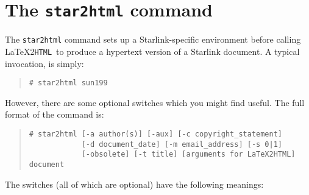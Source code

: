 \documentclass[twoside,11pt]{article}
\newcommand{\xlabel}[1]{}
\newcommand{\latextohtml}{\LaTeX2\texttt{HTML}}
\renewcommand{\_}{\texttt{\symbol{95}}}
\begin{document}
\appendix

\newpage
\section{\xlabel{the_star2html_command}The \texttt{star2html} command\label{star2html}}

The \texttt{star2html} command sets up a Starlink-specific environment before
calling \latextohtml\ to produce a hypertext version of a Starlink document.
A typical invocation, is simply:

\begin{quote}
\texttt{\# star2html sun199}
\end{quote}

However, there are some optional switches which you might find useful.
The full format of the command is:

\begin{quote}
\begin{verbatim}
# star2html [-a author(s)] [-aux] [-c copyright_statement] 
            [-d document_date] [-m email_address] [-s 0|1] 
            [-obsolete] [-t title] [arguments for LaTeX2HTML] document
\end{verbatim}
\end{quote}

The switches (all of which are optional) have the following meanings:
\end{document}

